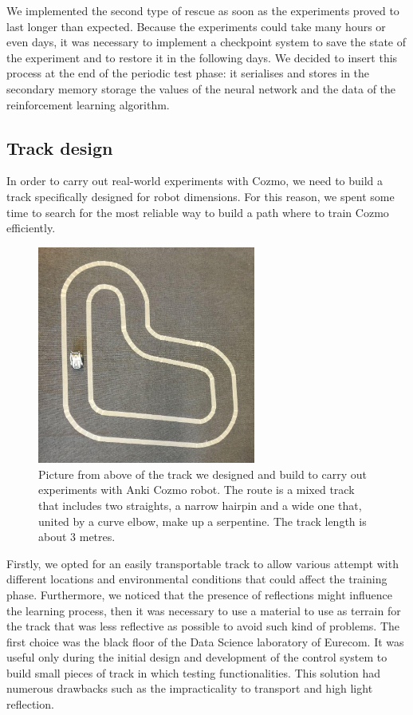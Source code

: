 We implemented the second type of rescue as soon as the experiments proved to last longer than expected.
Because the experiments could take many hours or even days, it was necessary to implement a checkpoint system to save the state of the experiment and to restore it in the following days.
We decided to insert this process at the end of the periodic test phase: it serialises and stores in the secondary memory storage the values of the neural network and the data of the reinforcement learning algorithm.

\subsection{Track design}

In order to carry out real-world experiments with Cozmo, we need to build a track specifically designed for robot dimensions.
For this reason, we spent some time to search for the most reliable way to build a path where to train Cozmo efficiently.

\begin{figure}
    \centering
    \includegraphics[width=0.64\textwidth]{img/track.png}
    \caption[CozmoDriver Racing Track]{ Picture from above of the track we designed and build to carry out experiments with Anki Cozmo robot.
        The route is a mixed track that includes two straights, a narrow hairpin and a wide one that, united by a curve elbow, make up a serpentine.
        The track length is about 3 metres.}
    \label{fig:track_cozmo}
\end{figure}


Firstly, we opted for an easily transportable track to allow various attempt with different locations and environmental conditions that could affect the training phase.
Furthermore, we noticed that the presence of reflections might influence the learning process, then it was necessary to use a material to use as terrain for the track that was less reflective as possible to avoid such kind of problems.
The first choice was the black floor of the Data Science laboratory of Eurecom.
It was useful only during the initial design and development of the control system to build small pieces of track in which testing functionalities.
This solution had numerous drawbacks such as the impracticality to transport and high light reflection.

